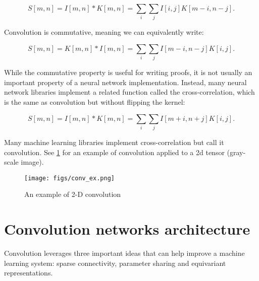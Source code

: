 \begin{equation}
  \label{2Dconvolution}
  S[m, n] = I[m, n] \ast K[m, n] = \sum_{i}\sum_{j} I[i, j] K[m - i, n - j].
\end{equation}

Convolution is commutative, meaning we can equivalently write:

\begin{equation}
  \label{2Dflipped}
  S[m, n] = K[m, n] \ast I[m, n] = \sum_{i}\sum_{j} I[m - i, n -j] K[i, j].
\end{equation}

While the commutative property is useful for writing proofs, it is not usually an important property of a neural
network implementation. Instead, many neural network libraries implement a
related function called the cross-correlation, which is the same as convolution
but without flipping the kernel:

\begin{equation}
  \label{cross-correlation}
  S[m, n] = I[m, n] \ast K[m, n] = \sum_{i}\sum_{j} I[m + i, n + j] K[i, j].
\end{equation}

Many machine learning libraries implement cross-correlation but call it convolution. See \cref{fig:conv-ex} for an example of convolution
applied to a 2d tensor (gray-scale image).


\begin{figure}[!htbp]
  \centering
  \texttt{[image: figs/conv\_ex.png]}
  \caption{An example of 2-D convolution}\label{fig:conv-ex}
\end{figure}

\section{Convolution networks architecture}

Convolution leverages three important ideas that can help improve a machine learning system: sparse connectivity, parameter sharing and
equivariant representations.

